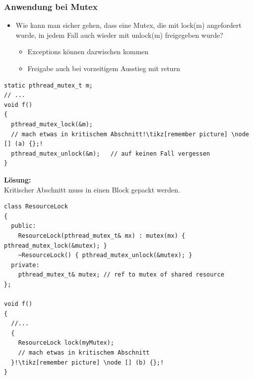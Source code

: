 \subsubsection{Anwendung bei Mutex}
\begin{itemize}[noitemsep,topsep=0pt]
  \item Wie kann man sicher gehen, dass eine Mutex, die mit lock(m) angefordert wurde, in jedem Fall auch wieder mit unlock(m) freigegeben wurde?
        \begin{itemize}
          \item Exceptions können dazwischen kommen
          \item Freigabe auch bei vorzeitigem Ausstieg mit return
        \end{itemize}
\end{itemize}
\begin{lstlisting}[style=C,escapechar=!]
static pthread_mutex_t m;
// ...
void f()
{
  pthread_mutex_lock(&m);
  // mach etwas in kritischem Abschnitt!\tikz[remember picture] \node [] (a) {};!
  pthread_mutex_unlock(&m);   // auf keinen Fall vergessen
}
\end{lstlisting}
\textbf{Lösung:}\\
Kritischer Abschnitt muss in einen Block gepackt werden.
\begin{lstlisting}[style=C,escapechar=!]
class ResourceLock
{
  public:
    ResourceLock(pthread_mutex_t& mx) : mutex(mx) { pthread_mutex_lock(&mutex); }
    ~ResourceLock() { pthread_mutex_unlock(&mutex); }
  private:
    pthread_mutex_t& mutex; // ref to mutex of shared resource
};

void f()
{
  //...
  {
    ResourceLock lock(myMutex);
    // mach etwas in kritischem Abschnitt
  }!\tikz[remember picture] \node [] (b) {};!
}
\end{lstlisting}
